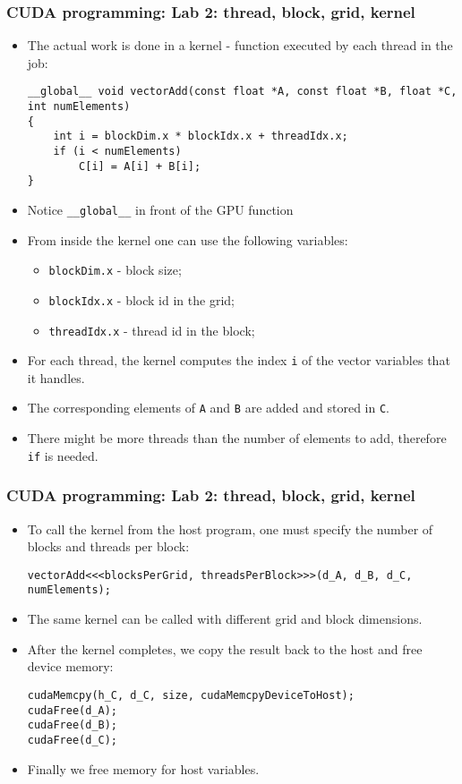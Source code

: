 \begin{frame}[fragile]
  \frametitle{CUDA programming: Lab 2: thread, block, grid, kernel}
\begin{itemize}
\item The actual work is done in a {\color{mycolordef}kernel} - function executed by each thread in the job:
{\tiny
{\color{mycolorcode}
\begin{verbatim}
__global__ void vectorAdd(const float *A, const float *B, float *C, int numElements)
{
    int i = blockDim.x * blockIdx.x + threadIdx.x;
    if (i < numElements)
        C[i] = A[i] + B[i];
}
\end{verbatim}
}
}
\item Notice {\color{mycolorcode}\verb|__global__|} in front of the GPU function
\item From inside the kernel one can use the following variables:
  \begin{itemize}
    \item {\color{mycolorcode}\verb|blockDim.x|} - block size;
    \item {\color{mycolorcode}\verb|blockIdx.x|} - block id in the grid;
    \item {\color{mycolorcode}\verb|threadIdx.x|} - thread id in the block;
  \end{itemize}
\item For each thread, the kernel computes the index {\color{mycolorcode}\verb|i|} of the vector variables that it handles.
\item The corresponding elements of {\color{mycolorcode}\verb|A|} and {\color{mycolorcode}\verb|B|} are added and stored in {\color{mycolorcode}\verb|C|}.
\item There might be more threads than the number of elements to add, therefore {\color{mycolorcode}\verb|if|} is needed.
\end{itemize}
\end{frame}

\begin{frame}[fragile]
  \frametitle{CUDA programming: Lab 2: thread, block, grid, kernel}
\begin{itemize}
\item To call the kernel from the host program, one must specify the number of blocks and threads per block:
{\tiny
{\color{mycolorcode}
\begin{verbatim}
vectorAdd<<<blocksPerGrid, threadsPerBlock>>>(d_A, d_B, d_C, numElements);
\end{verbatim}
}
}
\item The same kernel can be called with different grid and block dimensions.
\item After the kernel completes, we copy the result back to the host and free device memory:
{\color{mycolorcode}
\begin{verbatim}
cudaMemcpy(h_C, d_C, size, cudaMemcpyDeviceToHost);
cudaFree(d_A);
cudaFree(d_B);
cudaFree(d_C);
\end{verbatim}
}
\item Finally we free memory for host variables.
\end{itemize}
\end{frame}



